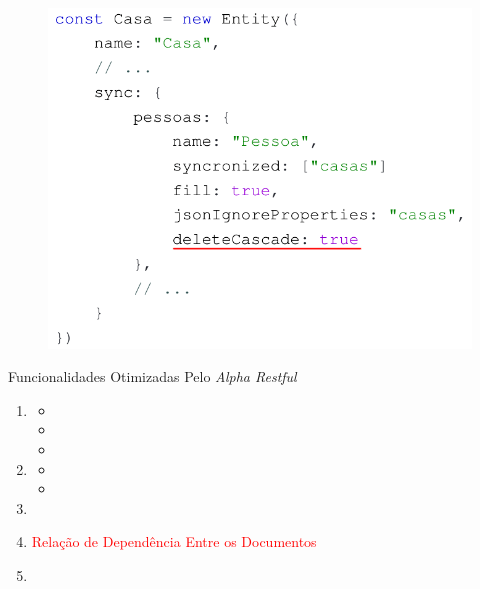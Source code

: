 \documentclass{beamer} %
\begin{document}
\begin{frame}
    \vspace*{-0.1cm}
    \begin{figure}
        \centering
        \includegraphics[height=\textheight]{imagens/delete-cascade.png}
        \label{fig:remocao-em-cascata}
    \end{figure}
\end{frame}

\begin{frame}{Funcionalidades Otimizadas Pelo \textit{Alpha Restful}}
    \begin{enumerate}
        \item {}
            \begin{itemize}
                \item {}
                \item {}
                \item {}
            \end{itemize}
        \item {}
            \begin{itemize}
                \item {}
                \item {}
            \end{itemize}
        \item {}
        \item \textcolor{red}{Relação de Dependência Entre os Documentos}
        \item {}
    \end{enumerate}
\end{frame}
\end{document}
